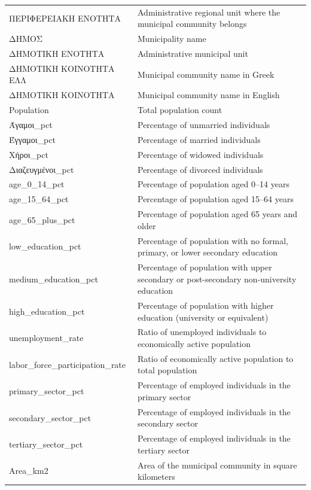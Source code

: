 \begin{longtable}{p{5cm} p{10cm}}
    ΠΕΡΙΦΕΡΕΙΑΚΗ ΕΝΟΤΗΤΑ & Administrative regional unit where the municipal community belongs \\
    ΔΗΜΟΣ & Municipality name \\
    ΔΗΜΟΤΙΚΗ ΕΝΟΤΗΤΑ & Administrative municipal unit \\
    ΔΗΜΟΤΙΚΗ ΚΟΙΝΟΤΗΤΑ ΕΛΛ & Municipal community name in Greek \\
    ΔΗΜΟΤΙΚΗ ΚΟΙΝΟΤΗΤΑ & Municipal community name in English \\
    Population & Total population count \\
    Άγαμοι\_pct & Percentage of unmarried individuals \\
    Έγγαμοι\_pct & Percentage of married individuals \\
    Χήροι\_pct & Percentage of widowed individuals \\
    Διαζευγμένοι\_pct & Percentage of divorced individuals \\
    age\_0\_14\_pct & Percentage of population aged 0–14 years \\
    age\_15\_64\_pct & Percentage of population aged 15–64 years \\
    age\_65\_plus\_pct & Percentage of population aged 65 years and older \\
    low\_education\_pct & Percentage of population with no formal, primary, or lower secondary education \\
    medium\_education\_pct & Percentage of population with upper secondary or post-secondary non-university education \\
    high\_education\_pct & Percentage of population with higher education (university or equivalent) \\
    unemployment\_rate & Ratio of unemployed individuals to economically active population \\
    labor\_force\_participation\_rate & Ratio of economically active population to total population \\
    primary\_sector\_pct & Percentage of employed individuals in the primary sector \\
    secondary\_sector\_pct & Percentage of employed individuals in the secondary sector \\
    tertiary\_sector\_pct & Percentage of employed individuals in the tertiary sector \\
    Area\_km2 & Area of the municipal community in square kilometers \\
\end{longtable}


